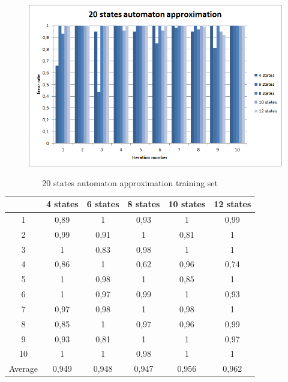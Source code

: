 \documentclass[runningheads,a4paper]{llncs}
\begin{document}
\begin{figure}
\centering
\includegraphics[scale=1]{2.png}
\end{figure}

\begin{table}[]
\centering
\caption{20 states automaton approximation training set}
\label{my-label}
\begin{tabular}{@{}cccccc@{}}
\toprule
        & 4 states & 6 states & 8 states & 10 states & 12 states    \\ \midrule
1       & 0,89     & 1        & 0,93     & 1         & 0,99 \\
2       & 0,99     & 0,91     & 1        & 0,81      & 1 \\
3       & 1        & 0,83     & 0,98     & 1         & 1 \\
4       & 0,86     & 1        & 0,62     & 0,96      & 0,74   \\
5       & 1        & 0,98     & 1        & 0,85      & 1   \\
6       & 1        & 0,97     & 0,99     & 1         & 0,93    \\
7       & 0,97     & 0,98     & 1        & 0,98      & 1    \\
8       & 0,85     & 1        & 0,97     & 0,96      & 0,99     \\
9       & 0,93     & 0,81     & 1        & 1         & 0,97 \\
10      & 1        & 1        & 0,98     & 1         & 1  \\
Average & 0,949    & 0,948    & 0,947    & 0,956     & 0,962  \\ \bottomrule
\end{tabular}
\end{table}
\end{document}

